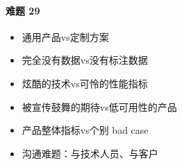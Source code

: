 \documentclass[letterpaper,11pt,english]{sphinxmanual}
\begin{document}
\paragraph{难题 29\sphinxfootnotemark[257]}
\label{\detokenize{chapter_introduction/AI_PM:id33}}%
\begin{footnotetext}[257]\sphinxAtStartFootnote
{}
%
\end{footnotetext}\ignorespaces \begin{itemize}
\item {} 
通用产品vs定制方案

\item {} 
完全没有数据vs没有标注数据

\item {} 
炫酷的技术vs可怜的性能指标

\item {} 
被宣传鼓舞的期待vs低可用性的产品

\item {} 
产品整体指标vs个别 bad case

\item {} 
沟通难题：与技术人员、与客户

\end{itemize}
\end{document}
